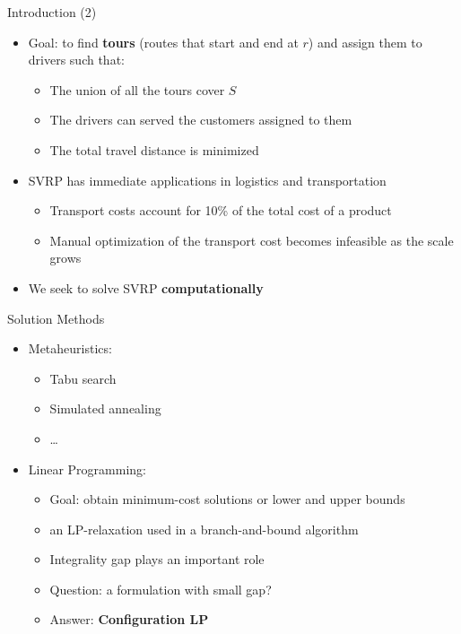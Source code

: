 \begin{frame}{Introduction (2)}
\begin{itemize}
    \item<1-> Goal: to find \textbf{tours} (routes that start and end at $r$) and assign them to drivers such that:
    \begin{itemize}
        \item<2-> The union of all the tours cover $S$
        \item<3-> The drivers can served the customers assigned to them
        \item<4-> The total travel distance is minimized
    \end{itemize}
    \item<5-> SVRP has immediate applications in logistics and transportation
        \begin{itemize}
            \item<6-> Transport costs account for 10\% of the total cost of a product
            \item<7-> Manual optimization of the transport cost becomes infeasible as the scale grows
        \end{itemize}
    \item<7-> We seek to solve SVRP \textbf{computationally}
\end{itemize}
\end{frame}


\begin{frame}[t]{Solution Methods}
    \begin{itemize}
        \item<1-> Metaheuristics:
            \begin{itemize}
                \item<2-> Tabu search
                \item<3-> Simulated annealing
                \item<4-> \ldots
            \end{itemize}
        \item<5-> Linear Programming:
            \begin{itemize}
                \item<6-> Goal: obtain minimum-cost solutions or lower and upper bounds
                \item<7-> an LP-relaxation used in a branch-and-bound algorithm
                \item<8-> Integrality gap plays an important role
                \item<9-> Question: a formulation with small gap?
                \item<10-> Answer: \textbf{Configuration LP}
            \end{itemize}
    \end{itemize}
\end{frame}


